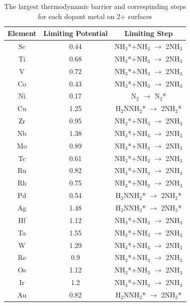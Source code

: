 \begin{table}
\begin{center}
\begin{tabular}{| c | c |c |}
\hline
Element & Limiting Potential & Limiting Step \\
\hline
Sc & 0.44 & NH$_3$*+NH$_3$ $\rightarrow$ 2NH$_3$\\
Ti & 0.68 & NH$_3$*+NH$_3$ $\rightarrow$ 2NH$_3$\\
V & 0.72 & NH$_3$*+NH$_3$ $\rightarrow$ 2NH$_3$\\
Co & 0.43 & NH$_3$*+NH$_3$ $\rightarrow$ 2NH$_3$\\
Ni & 0.17 & N$_2$ $\rightarrow$ N$_2$*\\
Cu & 1.25 & H$_2$NNH$_2$* $\rightarrow$ 2NH$_2$*\\
Zr & 0.95 & NH$_3$*+NH$_3$ $\rightarrow$ 2NH$_3$\\
Nb & 1.38 & NH$_3$*+NH$_3$ $\rightarrow$ 2NH$_3$\\
Mo & 0.89 & NH$_3$*+NH$_3$ $\rightarrow$ 2NH$_3$\\
Tc & 0.61 & NH$_3$*+NH$_3$ $\rightarrow$ 2NH$_3$\\
Ru & 0.82 & NH$_3$*+NH$_3$ $\rightarrow$ 2NH$_3$\\
Rh & 0.75 & NH$_3$*+NH$_3$ $\rightarrow$ 2NH$_3$\\
Pd & 0.54 & H$_2$NNH$_2$* $\rightarrow$ 2NH$_2$*\\
Ag & 1.48 & H$_2$NNH$_2$* $\rightarrow$ 2NH$_2$*\\
Hf & 1.12 & NH$_3$*+NH$_3$ $\rightarrow$ 2NH$_3$\\
Ta & 1.55 & NH$_3$*+NH$_3$ $\rightarrow$ 2NH$_3$\\
W & 1.29 & NH$_3$*+NH$_3$ $\rightarrow$ 2NH$_3$\\
Re & 0.9 & NH$_3$*+NH$_3$ $\rightarrow$ 2NH$_3$\\
Os & 1.12 & NH$_3$*+NH$_3$ $\rightarrow$ 2NH$_3$\\
Ir & 1.2 & NH$_3$*+NH$_3$ $\rightarrow$ 2NH$_3$\\
Au & 0.82 & H$_2$NNH$_2$* $\rightarrow$ 2NH$_2$*\\
\hline
\end{tabular}
\end{center}
\caption{The largest thermodynamic barrier and correspinding steps for each dopant metal on 2+ surfaces}\label{table:limiting_steps}\end{table}\begin{figure}
\centering

\end{figure}
